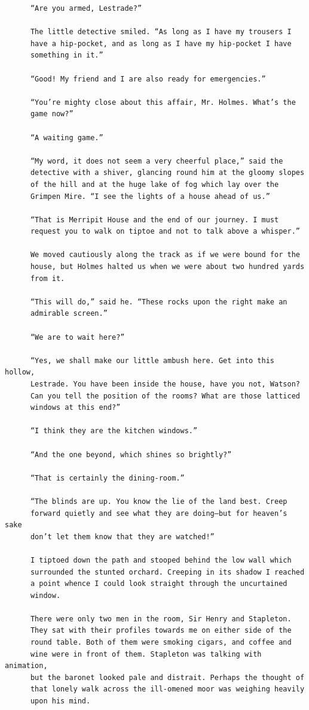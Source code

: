 \documentclass{article}
\begin{document}
\begin{verbatim}
      “Are you armed, Lestrade?”

      The little detective smiled. “As long as I have my trousers I
      have a hip-pocket, and as long as I have my hip-pocket I have
      something in it.”

      “Good! My friend and I are also ready for emergencies.”

      “You’re mighty close about this affair, Mr. Holmes. What’s the
      game now?”

      “A waiting game.”

      “My word, it does not seem a very cheerful place,” said the
      detective with a shiver, glancing round him at the gloomy slopes
      of the hill and at the huge lake of fog which lay over the
      Grimpen Mire. “I see the lights of a house ahead of us.”

      “That is Merripit House and the end of our journey. I must
      request you to walk on tiptoe and not to talk above a whisper.”

      We moved cautiously along the track as if we were bound for the
      house, but Holmes halted us when we were about two hundred yards
      from it.

      “This will do,” said he. “These rocks upon the right make an
      admirable screen.”

      “We are to wait here?”

      “Yes, we shall make our little ambush here. Get into this hollow,
      Lestrade. You have been inside the house, have you not, Watson?
      Can you tell the position of the rooms? What are those latticed
      windows at this end?”

      “I think they are the kitchen windows.”

      “And the one beyond, which shines so brightly?”

      “That is certainly the dining-room.”

      “The blinds are up. You know the lie of the land best. Creep
      forward quietly and see what they are doing—but for heaven’s sake
      don’t let them know that they are watched!”

      I tiptoed down the path and stooped behind the low wall which
      surrounded the stunted orchard. Creeping in its shadow I reached
      a point whence I could look straight through the uncurtained
      window.

      There were only two men in the room, Sir Henry and Stapleton.
      They sat with their profiles towards me on either side of the
      round table. Both of them were smoking cigars, and coffee and
      wine were in front of them. Stapleton was talking with animation,
      but the baronet looked pale and distrait. Perhaps the thought of
      that lonely walk across the ill-omened moor was weighing heavily
      upon his mind.


\end{verbatim}
\end{document}
